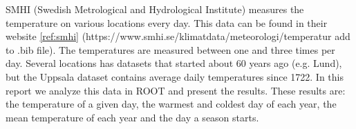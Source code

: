 

SMHI (Swedish Metrological and Hydrological Institute) measures the temperature on various locations every day. This data can be found in their website \ref{ref:smhi} (https://www.smhi.se/klimatdata/meteorologi/temperatur add to .bib file). The temperatures are measured between one and three times per day. Several locations has datasets that started about 60 years ago (e.g. Lund), but the Uppsala dataset contains average daily temperatures since 1722. In this report we analyze this data in ROOT and present the results. These results are: the temperature of a given day, the warmest and coldest day of each year, the mean temperature of each year and the day a season starts. 


